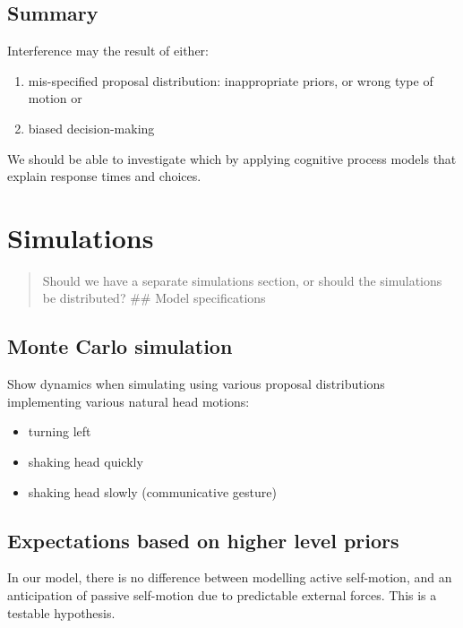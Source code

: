 \documentclass[english,floatsintext,man]{apa6}
\providecommand{\tightlist}{%
  \setlength{\itemsep}{0pt}\setlength{\parskip}{0pt}}
\theoremstyle{definition}
\theoremstyle{definition}
\theoremstyle{remark}
\begin{document}
\subsection{Summary}\label{summary}

Interference may the result of either:

\begin{enumerate}
\def\labelenumi{\arabic{enumi})}
\tightlist
\item
  mis-specified proposal distribution: inappropriate priors, or wrong
  type of motion or
\item
  biased decision-making
\end{enumerate}

We should be able to investigate which by applying cognitive process
models that explain response times and choices.

\section{Simulations}\label{simulations}

\begin{quote}
Should we have a separate simulations section, or should the simulations
be distributed? \#\# Model specifications
\end{quote}

\subsection{Monte Carlo simulation}\label{monte-carlo-simulation}

Show dynamics when simulating using various proposal distributions
implementing various natural head motions:

\begin{itemize}
\tightlist
\item
  turning left
\item
  shaking head quickly
\item
  shaking head slowly (communicative gesture)
\end{itemize}

\subsection{Expectations based on higher level
priors}\label{expectations-based-on-higher-level-priors}

In our model, there is no difference between modelling active
self-motion, and an anticipation of passive self-motion due to
predictable external forces. This is a testable hypothesis.
\end{document}
